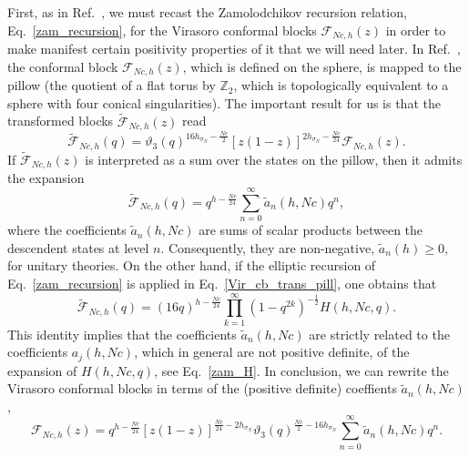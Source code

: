 \documentclass[a4paper,11pt]{article}
\begin{document}
First, as in Ref.~\cite{Collier}, we must recast the Zamolodchikov recursion relation, 
Eq.~\eqref{zam_recursion}, for the Virasoro conformal blocks $\mathcal{F}_{Nc, h}(z)$ 
in order to make manifest certain positivity properties of it that we will need later.  
In Ref.~\cite{Maldacena}, the conformal block $\mathcal{F}_{Nc, h}(z)$, which is defined 
on the sphere, is mapped to the pillow (the quotient of a flat torus by $\mathbb{Z}_2$, 
which is topologically equivalent to a sphere with four conical singularities). The 
important result for us is that the transformed blocks $\tilde{\mathcal{F}}_{Nc, h}(z)$ read 
\begin{equation}\label{Vir_cb_trans_pill}
 \tilde{\mathcal{F}}_{Nc, h}(q)=\mathcal{\vartheta}_3(q)^{16h_{\sigma_N}-\frac{Nc}{2}}
 \left[z(1-z)\right]^{2h_{\sigma_N}-\frac{Nc}{24}}\mathcal{F}_{Nc, h}(z).
\end{equation}
If $\tilde{\mathcal{F}}_{Nc, h}(z)$ is interpreted as a sum over the states on the pillow, 
then it admits the expansion
\begin{equation}
 \tilde{\mathcal{F}}_{Nc, h}(q)=q^{h-\frac{Nc}{24}}\sum_{n=0}^\infty \tilde{a}_n(h, Nc) q^{n},
\end{equation}
where the coefficients $\tilde{a}_n(h, Nc)$ are sums of scalar products between the descendent 
states at level $n$. Consequently, they are non-negative, $\tilde{a}_n(h)\geq 0$, for 
unitary theories. On the other hand, if the elliptic recursion of Eq.~\eqref{zam_recursion} is applied in 
Eq.~\eqref{Vir_cb_trans_pill}, one obtains that 
\begin{equation}
 \tilde{\mathcal{F}}_{Nc, h}(q)=
 (16q)^{h-\frac{Nc}{24}}
 \prod_{k=1}^\infty\left(1-q^{2k}\right)^{-\frac{1}{2}}H(h, Nc, q).
\end{equation}
This identity implies that the coefficients $\tilde{a}_n(h, Nc)$ are strictly 
related to the coefficients $a_j(h, Nc)$, which in general are not positive definite, 
of the expansion of $H(h, Nc, q)$, see Eq.~\eqref{zam_H}. In conclusion, we can rewrite the 
Virasoro conformal blocks in terms of the (positive definite) coeffients $\tilde{a}_n(h, Nc)$,
\begin{equation}\label{Vir_cb_pillow}
 \mathcal{F}_{Nc, h}(z)=q^{h-\frac{Nc}{24}}\left[z(1-z)\right]^{\frac{Nc}{24}-2h_{\sigma_N}}
 \vartheta_3(q)^{\frac{Nc}{2}-16h_{\sigma_N}}\sum_{n=0}^\infty \tilde{a}_n(h, Nc) q^n.
\end{equation}
\end{document}
